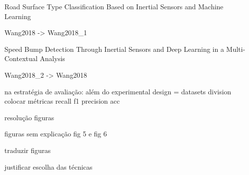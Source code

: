 Road Surface Type Classification Based on Inertial Sensors and Machine Learning

Wang2018 -> Wang2018_1

Speed Bump Detection Through Inertial Sensors and Deep Learning in a Multi-Contextual Analysis

Wang2018_2 -> Wang2018


na estratégia de avaliação:
além do experimental design = datasets division
colocar métricas recall f1 precision acc

resolução figuras

figuras sem explicação fig 5 e fig 6

traduzir figuras

justificar escolha das técnicas

